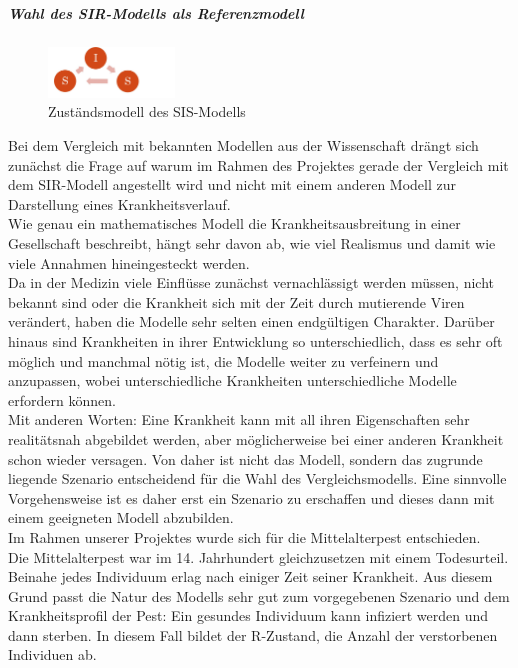 \subparagraph{Wahl des SIR-Modells als Referenzmodell}
\begin{figure}
\includegraphics[width= 0.3\textwidth]{./images/SIS-Modell.jpg}\caption{Zuständsmodell des SIS-Modells}\label{sis}
\end{figure}
Bei dem Vergleich mit bekannten Modellen aus der Wissenschaft drängt sich zunächst die Frage auf warum im Rahmen des Projektes gerade der Vergleich mit dem SIR-Modell angestellt wird und nicht mit einem anderen Modell zur Darstellung eines Krankheitsverlauf.\\
Wie genau ein mathematisches Modell die Krankheitsausbreitung in einer Gesellschaft beschreibt, hängt sehr davon ab, wie viel Realismus und damit wie viele Annahmen hineingesteckt werden.\\
Da in der Medizin viele Einflüsse zunächst vernachlässigt werden müssen, nicht bekannt sind oder die Krankheit sich mit der Zeit durch mutierende Viren verändert, haben die Modelle sehr selten einen endgültigen Charakter. Darüber hinaus sind Krankheiten in ihrer Entwicklung so unterschiedlich, dass es sehr oft möglich und manchmal nötig ist, die Modelle weiter zu verfeinern und anzupassen, wobei unterschiedliche Krankheiten unterschiedliche Modelle erfordern können. 
\cite{sebM}\\
Mit anderen Worten: Eine Krankheit kann mit all ihren Eigenschaften sehr realitätsnah abgebildet werden, aber möglicherweise bei einer anderen Krankheit schon wieder versagen. Von daher ist nicht das Modell, sondern das zugrunde liegende Szenario entscheidend für die Wahl des Vergleichsmodells. Eine sinnvolle Vorgehensweise ist es daher erst ein Szenario zu erschaffen und dieses dann mit einem geeigneten Modell abzubilden.\\ 
Im Rahmen unserer Projektes wurde sich für die Mittelalterpest entschieden.\\ 
Die Mittelalterpest war im 14. Jahrhundert gleichzusetzen mit einem Todesurteil. Beinahe jedes Individuum erlag nach einiger Zeit seiner Krankheit. Aus diesem Grund passt die Natur des Modells sehr gut zum vorgegebenen Szenario und dem Krankheitsprofil der Pest: Ein gesundes Individuum kann infiziert werden und dann sterben. In diesem Fall bildet der \glqq R\grqq-Zustand, die Anzahl der verstorbenen Individuen ab.\\
